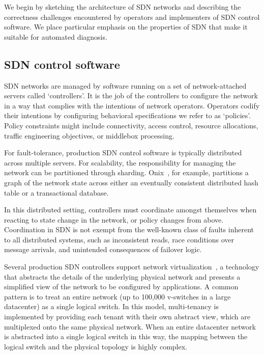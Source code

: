 We begin by sketching the architecture of SDN networks and
describing the correctness challenges encountered by operators and
implementers of SDN control software. We place particular emphasis on the
properties of SDN that make it suitable for automated diagnosis.

\subsection{SDN control software}
\label{subsec:control_software}

SDN networks are managed by software running on a set of network-attached
servers called `controllers'. It is the job of the controllers to configure
the network in a way that complies with the intentions of network
operators. Operators codify their intentions by configuring
behavioral specifications we refer to as `policies'. Policy constraints might
include connectivity, access control,
resource allocations, traffic engineering objectives, or middlebox
processing.

For fault-tolerance, production SDN control software is typically
distributed across multiple servers. For scalability, the responsibility for
managing the network can be partitioned through sharding.
Onix~\cite{onix}, for example, partitions a
graph of the network state across either an eventually consistent
distributed hash table or a
transactional database.

In this distributed setting, controllers must coordinate amongst themselves
when reacting to state change in the network, or
policy changes from above.
Coordination in SDN is not exempt from the well-known class of faults
inherent to all distributed systems, such as
inconsistent reads, race conditions over message arrivals, and
unintended consequences of failover logic.

Several production SDN controllers support network
virtualization~\cite{bigswitch,nicirahomepage,contextream}, a technology that
abstracts the details of the underlying physical network and presents a
simplified view of the network to be configured by applications.
A common pattern is to treat an entire network (up to
100,000 v-switches in a large datacenter) as a single logical switch.
In this model, multi-tenancy is implemented by providing each tenant with their
own abstract view, which are multiplexed onto the same physical network.
When an entire datacenter network is
abstracted into a single logical switch in this way, the mapping between
the logical switch and the physical topology is highly complex.

